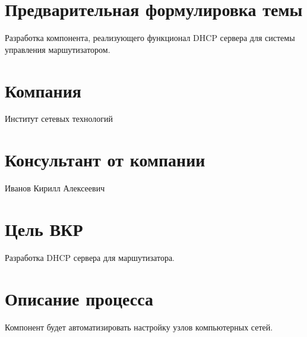 \documentclass[12pt]{article}
\begin{document}

\section{Предварительная формулировка темы}
Разработка компонента, реализующего функционал DHCP сервера для системы управления маршутизатором.

\section{Компания}
Институт сетевых технологий

\section{Консультант от компании}
Иванов Кирилл Алексеевич

\section{Цель ВКР}

Разработка DHCP сервера для маршутизатора.

\section{Описание процесса}
Компонент будет автоматизировать настройку узлов компьютерных сетей.
\end{document}
